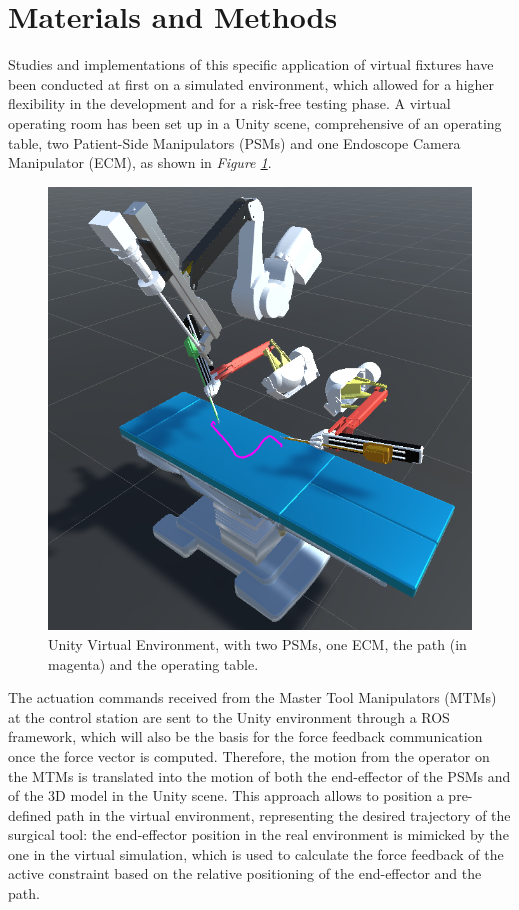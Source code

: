 \documentclass[conference]{IEEEtran}
\begin{document}
\section{Materials and Methods}
    Studies and implementations of this specific application of virtual
    fixtures have been conducted at first on a simulated environment,
    which allowed for a higher flexibility in the development and for a
    risk-free testing phase. A virtual operating room has been set up in a
    Unity scene, comprehensive of an operating table, two Patient-Side
    Manipulators (PSMs) and one Endoscope Camera Manipulator (ECM), as
    shown in \textit{Figure \ref{fig:Unity Scene}}. 
    \begin{figure}[t]
        \centering
        \includegraphics[width=\linewidth]{unityscene.png}
        \caption{Unity Virtual Environment, with two PSMs, one ECM, the path (in magenta) and the operating table.}
        \label{fig:Unity Scene}
    \end{figure}
    The actuation commands received from the Master Tool Manipulators
    (MTMs) at the control station are sent to the Unity environment
    through a ROS framework, which will also be the basis for the force
    feedback communication once the force vector is computed. Therefore,
    the motion from the operator on the MTMs is translated into the motion
    of both the end-effector of the PSMs and of the 3D model in the Unity
    scene. This approach allows to position a pre-defined path in the
    virtual environment, representing the desired trajectory of the
    surgical tool: the end-effector position in the real environment is
    mimicked by the one in the virtual simulation, which is used to
    calculate the force feedback of the active constraint based on the
    relative positioning of the end-effector and the path. 
\end{document}

